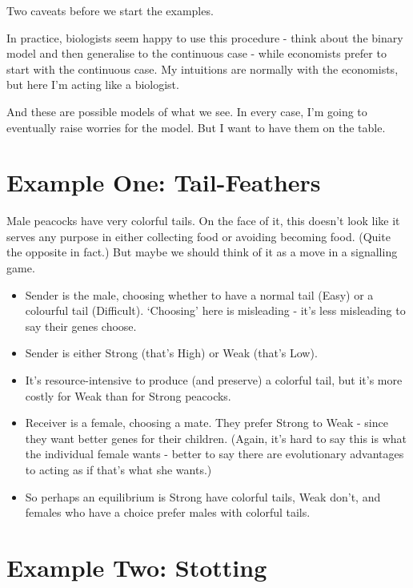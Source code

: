 \documentclass[11pt,]{article}
\providecommand{\tightlist}{%
  \setlength{\itemsep}{0pt}\setlength{\parskip}{0pt}}
\begin{document}
Two caveats before we start the examples.

In practice, biologists seem happy to use this procedure - think about
the binary model and then generalise to the continuous case - while
economists prefer to start with the continuous case. My intuitions are
normally with the economists, but here I'm acting like a biologist.

And these are possible models of what we see. In every case, I'm going
to eventually raise worries for the model. But I want to have them on
the table.

\hypertarget{example-one-tail-feathers}{%
\section{Example One: Tail-Feathers}\label{example-one-tail-feathers}}

Male peacocks have very colorful tails. On the face of it, this doesn't
look like it serves any purpose in either collecting food or avoiding
becoming food. (Quite the opposite in fact.) But maybe we should think
of it as a move in a signalling game.

\begin{itemize}
\tightlist
\item
  Sender is the male, choosing whether to have a normal tail (Easy) or a
  colourful tail (Difficult). `Choosing' here is misleading - it's less
  misleading to say their genes choose.
\item
  Sender is either Strong (that's High) or Weak (that's Low).
\item
  It's resource-intensive to produce (and preserve) a colorful tail, but
  it's more costly for Weak than for Strong peacocks.
\item
  Receiver is a female, choosing a mate. They prefer Strong to Weak -
  since they want better genes for their children. (Again, it's hard to
  say this is what the individual female wants - better to say there are
  evolutionary advantages to acting as if that's what she wants.)
\item
  So perhaps an equilibrium is Strong have colorful tails, Weak don't,
  and females who have a choice prefer males with colorful tails.
\end{itemize}

\hypertarget{example-two-stotting}{%
\section{Example Two: Stotting}\label{example-two-stotting}}
\end{document}
